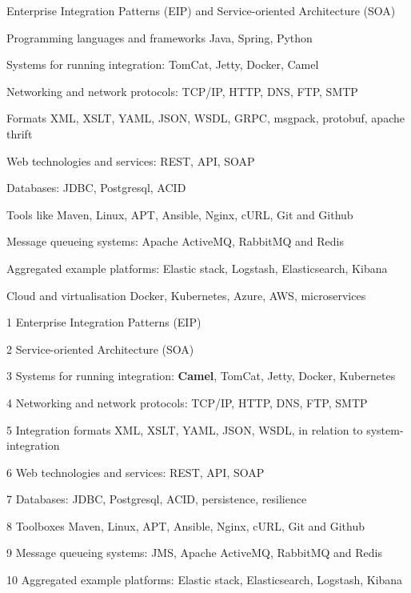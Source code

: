 \documentclass[Screen16to9,17pt]{foils}
\begin{document}
\begin{list2}
\item Enterprise Integration Patterns (EIP) and Service-oriented Architecture (SOA)
\item Programming languages and frameworks Java, Spring, Python
\item Systems for running integration: TomCat, Jetty, Docker, Camel
\item Networking and network protocols: TCP/IP, HTTP, DNS, FTP, SMTP
\item Formats XML, XSLT, YAML, JSON, WSDL, GRPC, msgpack, protobuf, apache thrift
\item Web technologies and services: REST, API, SOAP
\item Databases: JDBC, Postgresql, ACID
\item Tools like Maven, Linux, APT, Ansible, Nginx, cURL, Git and Github
\item Message queueing systems: Apache ActiveMQ, RabbitMQ and Redis
\item Aggregated example platforms: Elastic stack, Logstash, Elasticsearch, Kibana
\item Cloud and virtualisation Docker, Kubernetes, Azure, AWS, microservices
\end{list2}







\begin{list2}
\item[1] Enterprise Integration Patterns (EIP)
\item[2] Service-oriented Architecture (SOA)
\item[3] Systems for running integration: {\bf Camel}, TomCat, Jetty, Docker, Kubernetes
\item[4] Networking and network protocols: TCP/IP, HTTP, DNS, FTP, SMTP
\item[5] Integration formats XML, XSLT, YAML, JSON, WSDL, in relation to system-integration
\item[6] Web technologies and services: REST, API, SOAP
\item[7] Databases: JDBC, Postgresql, ACID, persistence, resilience
\item[8] Toolboxes Maven, Linux, APT, Ansible, Nginx, cURL, Git and Github
\item[9] Message queueing systems: JMS, Apache ActiveMQ, RabbitMQ and Redis
\item[10] Aggregated example platforms: Elastic stack,  Elasticsearch, Logstash, Kibana
\end{list2}
\end{document}
